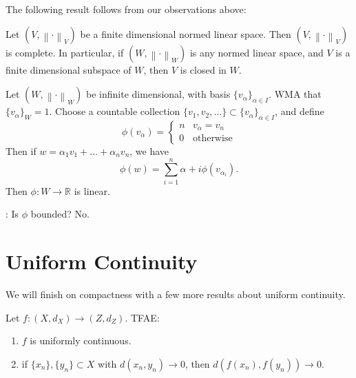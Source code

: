 \documentclass[notoc,notitlepage]{tufte-book}
\newcommand{\norm}[1]{\left\| #1 \right\|}
\begin{document}
The following result follows from our observations above:

\begin{thm}\label{thm:completeness_of_finite_dimensional_normed_lienar_spaces}
  Let $(V, \norm\cdot_V)$ be a finite dimensional normed linear space. Then $(V, \norm\cdot_V)$ is complete. In particular, if $(W, \norm\cdot_W)$ is any normed linear space, and $V$ is a finite dimensional subspace of $W$, then $V$ is closed in $W$.
\end{thm}

\begin{eg}
  Let $(W, \norm\cdot_W)$ be infinite dimensional, with basis $\{ v_\alpha \}_{\alpha \in I}$. WMA that $\{ v_\alpha \}_W = 1$. Choose a countable collection $\{ v_1, v_2, \ldots \} \subset \{ v_\alpha \}_{\alpha \in I}$, and define
  \begin{equation*}
    \phi(v_\alpha) = \begin{cases}
      n & v_\alpha = v_n \\
      0 & \text{otherwise}
    \end{cases}
  \end{equation*}
  Then if $w = \alpha_1 v_1 + \hdots + \alpha_n v_n$, we have
  \begin{equation*}
    \phi(w) = \sum_{i=1}^{n} \alpha+i \phi(v_{\alpha_i}).
  \end{equation*}
  Then $\phi : W \to \mathbb{R}$ is linear.
\end{eg}

: Is $\phi$ bounded? No.


\section{Uniform Continuity}%
\label{sec:uniform_continuity}

We will finish on compactness with a few more results about uniform continuity.

\begin{thm}\label{thm:sequential_characterization_of_uniform_continuity}
  Let $f : (X, d_X) \to (Z, d_Z)$. TFAE:
  \begin{enumerate}
    \item $f$ is uniformly continuous.
    \item if $\{ x_n \}, \{ y_n \} \subset X$ with $d(x_n, y_n) \to 0$, then $d(f(x_n), f(y_n)) \to 0$.
  \end{enumerate}
\end{thm}
\end{document}

